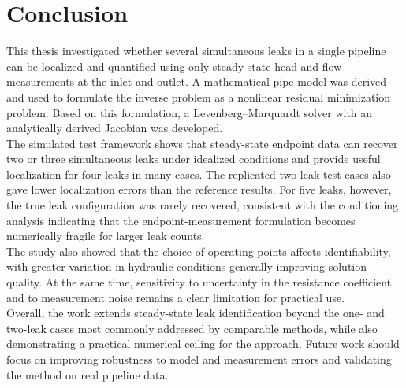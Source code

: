 \chapter{Conclusion}

This thesis investigated whether several simultaneous leaks in a single pipeline can be localized and quantified using only steady-state head and flow measurements at the inlet and outlet. A mathematical pipe model was derived and used to formulate the inverse problem as a nonlinear residual minimization problem. Based on this formulation, a Levenberg--Marquardt solver with an analytically derived Jacobian was developed.\\

The simulated test framework shows that steady-state endpoint data can recover two or three simultaneous leaks under idealized conditions and provide useful localization for four leaks in many cases. The replicated two-leak test cases also gave lower localization errors than the reference results. For five leaks, however, the true leak configuration was rarely recovered, consistent with the conditioning analysis indicating that the endpoint-measurement formulation becomes numerically fragile for larger leak counts.\\

The study also showed that the choice of operating points affects identifiability, with greater variation in hydraulic conditions generally improving solution quality. At the same time, sensitivity to uncertainty in the resistance coefficient and to measurement noise remains a clear limitation for practical use.\\

Overall, the work extends steady-state leak identification beyond the one- and two-leak cases most commonly addressed by comparable methods, while also demonstrating a practical numerical ceiling for the approach. Future work should focus on improving robustness to model and measurement errors and validating the method on real pipeline data.

